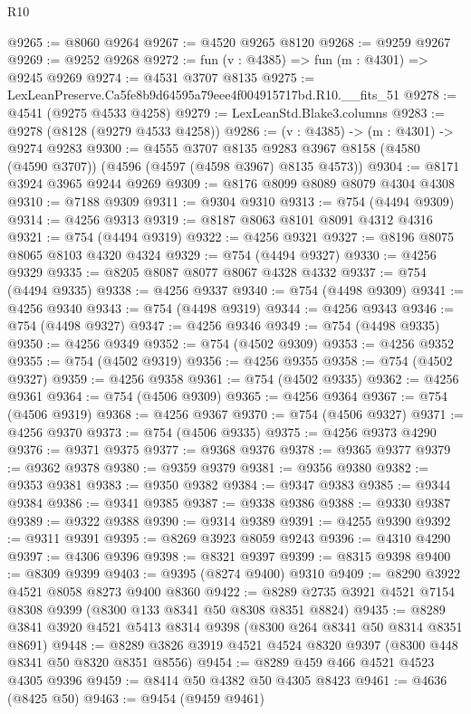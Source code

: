 \begin{lexlean}{R10}
\begin{coremodule}
@9265 := @8060 @9264
@9267 := @4520 @9265 @8120
@9268 := @9259 @9267
@9269 := @9252 @9268
@9272 := fun (v : @4385) => fun (m : @4301) => @9245 @9269
@9274 := @4531 @3707 @8135
@9275 := LexLeanPreserve.Ca5fe8b9d64595a79eee4f004915717bd.R10.__fits_51
@9278 := @4541 (@9275 @4533 @4258)
@9279 := LexLeanStd.Blake3.columns
@9283 := @9278 (@8128 (@9279 @4533 @4258))
@9286 := (v : @4385) -> (m : @4301) -> @9274 @9283
@9300 := @4555
    @3707
    @8135
    @9283
    @3967
    @8158
    (@4580 (@4590 @3707))
    (@4596 (@4597 (@4598 @3967) @8135 @4573))
@9304 := @8171 @3924 @3965 @9244 @9269
@9309 := @8176 @8099 @8089 @8079 @4304 @4308
@9310 := @7188 @9309
@9311 := @9304 @9310
@9313 := @754 (@4494 @9309)
@9314 := @4256 @9313
@9319 := @8187 @8063 @8101 @8091 @4312 @4316
@9321 := @754 (@4494 @9319)
@9322 := @4256 @9321
@9327 := @8196 @8075 @8065 @8103 @4320 @4324
@9329 := @754 (@4494 @9327)
@9330 := @4256 @9329
@9335 := @8205 @8087 @8077 @8067 @4328 @4332
@9337 := @754 (@4494 @9335)
@9338 := @4256 @9337
@9340 := @754 (@4498 @9309)
@9341 := @4256 @9340
@9343 := @754 (@4498 @9319)
@9344 := @4256 @9343
@9346 := @754 (@4498 @9327)
@9347 := @4256 @9346
@9349 := @754 (@4498 @9335)
@9350 := @4256 @9349
@9352 := @754 (@4502 @9309)
@9353 := @4256 @9352
@9355 := @754 (@4502 @9319)
@9356 := @4256 @9355
@9358 := @754 (@4502 @9327)
@9359 := @4256 @9358
@9361 := @754 (@4502 @9335)
@9362 := @4256 @9361
@9364 := @754 (@4506 @9309)
@9365 := @4256 @9364
@9367 := @754 (@4506 @9319)
@9368 := @4256 @9367
@9370 := @754 (@4506 @9327)
@9371 := @4256 @9370
@9373 := @754 (@4506 @9335)
@9375 := @4256 @9373 @4290
@9376 := @9371 @9375
@9377 := @9368 @9376
@9378 := @9365 @9377
@9379 := @9362 @9378
@9380 := @9359 @9379
@9381 := @9356 @9380
@9382 := @9353 @9381
@9383 := @9350 @9382
@9384 := @9347 @9383
@9385 := @9344 @9384
@9386 := @9341 @9385
@9387 := @9338 @9386
@9388 := @9330 @9387
@9389 := @9322 @9388
@9390 := @9314 @9389
@9391 := @4255 @9390
@9392 := @9311 @9391
@9395 := @8269 @3923 @8059 @9243
@9396 := @4310 @4290
@9397 := @4306 @9396
@9398 := @8321 @9397
@9399 := @8315 @9398
@9400 := @8309 @9399
@9403 := @9395 (@8274 @9400) @9310
@9409 := @8290 @3922 @4521 @8058 @8273 @9400 @8360
@9422 := @8289 @2735 @3921 @4521 @7154 @8308 @9399 (@8300 @133 @8341 @50 @8308 @8351 @8824)
@9435 := @8289 @3841 @3920 @4521 @5413 @8314 @9398 (@8300 @264 @8341 @50 @8314 @8351 @8691)
@9448 := @8289 @3826 @3919 @4521 @4524 @8320 @9397 (@8300 @448 @8341 @50 @8320 @8351 @8556)
@9454 := @8289 @459 @466 @4521 @4523 @4305 @9396
@9459 := @8414 @50 @4382 @50 @4305 @8423
@9461 := @4636 (@8425 @50)
@9463 := @9454 (@9459 @9461)

\end{coremodule}
\end{lexlean}
